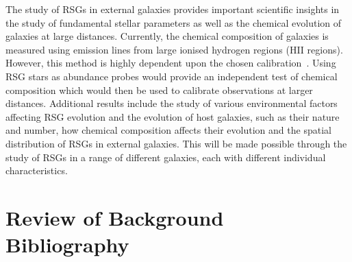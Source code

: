 \documentclass[a4paper,12pt]{article}
\begin{document}
The study of RSGs in external galaxies provides important scientific insights in the study of fundamental stellar parameters as well as the chemical evolution of galaxies at large distances.
Currently, the chemical composition of galaxies is measured using emission lines from large ionised hydrogen regions (HII regions). 
However, this method is highly dependent upon the chosen calibration~\citep[e.g.][]{Kudritzki10}.
Using RSG stars as abundance probes would provide an independent test of chemical composition which would then be used to calibrate observations at larger distances.
Additional results include the study of various environmental factors affecting RSG evolution and the evolution of host galaxies, such as their nature and number, how chemical composition affects their evolution and the spatial distribution of RSGs in external galaxies.
This will be made possible through the study of RSGs in a range of different galaxies, each with different individual characteristics. 




\section{Review of Background Bibliography}



\end{document}

